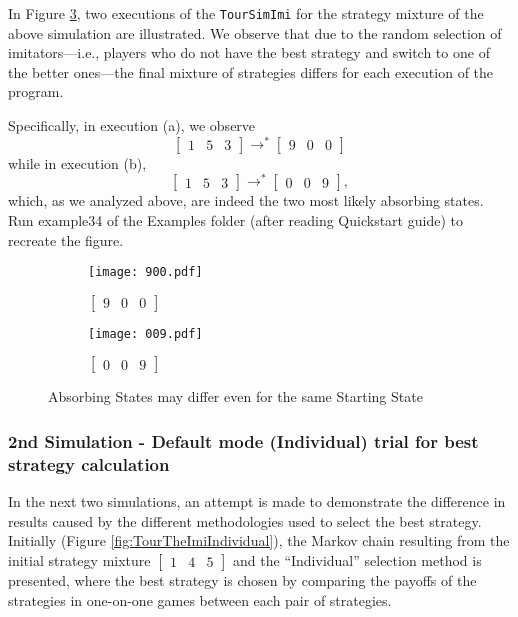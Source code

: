 In Figure \ref{fig:TourSimImi153}, two executions of the \texttt{TourSimImi} for the strategy mixture of the above simulation are illustrated. We observe that due to the random selection of imitators—i.e., players who do not have the best strategy and switch to one of the better ones—the final mixture of strategies differs for each execution of the program. 

Specifically, in execution (a), we observe 
\[
\begin{bmatrix}1 & 5 & 3\end{bmatrix} \rightarrow^* \begin{bmatrix}9 & 0 & 0\end{bmatrix}
\]
while in execution (b),
\[
\begin{bmatrix}1 & 5 & 3\end{bmatrix} \rightarrow^* \begin{bmatrix}0 & 0 & 9\end{bmatrix},
\]
which, as we analyzed above, are indeed the two most likely absorbing states. Run example34 of the Examples folder (after reading Quickstart guide) to recreate the figure.

	\begin{figure}[h]
		\centering
		\begin{subfigure}{.5\textwidth}
			\centering
	      	\texttt{[image: 900.pdf]}
			\caption{$\begin{bmatrix}9&0&0\end{bmatrix}$}
	      	\label{fig:900}
		\end{subfigure}%
		\begin{subfigure}{.5\textwidth}
			\centering
	      	\texttt{[image: 009.pdf]}
			\caption{$\begin{bmatrix}0&0&9\end{bmatrix}$}
	      	\label{fig:009}
		\end{subfigure}
		\caption{Absorbing States may differ even for the same Starting State}
		\label{fig:TourSimImi153}
	\end{figure}

\subsubsection{2nd Simulation - Default mode (Individual) trial for best strategy calculation}
In the next two simulations, an attempt is made to demonstrate the difference in results caused by the different methodologies used to select the best strategy. Initially (Figure \ref{fig:TourTheImiIndividual}), the Markov chain resulting from the initial strategy mixture $\begin{bmatrix}1 & 4 & 5\end{bmatrix}$ and the ``Individual'' selection method is presented, where the best strategy is chosen by comparing the payoffs of the strategies in one-on-one games between each pair of strategies.

